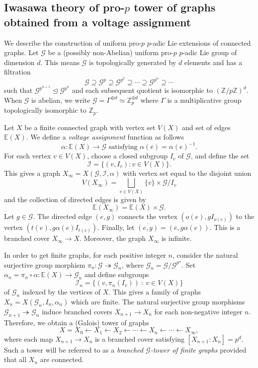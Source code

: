 \documentclass{amsart}
\numberwithin{equation}{section}
\theoremstyle{remark}
\newcommand{\Z}{\mathbb{Z}}
\newcommand{\E}{\mathbb{E}}
\newcommand{\I}{\mathcal{I}}
\newcommand{\cG}{\mathcal{G}}
\theoremstyle{plain} %
\begin{document}
\subsection{Iwasawa theory of pro-\texorpdfstring{$p$}{} tower of graphs obtained from a voltage assignment}
\label{sec: IT of pro-p tower}
We describe the construction of uniform pro-$p$ $p$-adic Lie extensions of connected graphs.
Let $\cG$ be a (possibly non-Abelian) uniform pro-$p$ $p$-adic Lie group of dimension $d$.
This means $\cG$ is topologically generated by $d$ elements and has a filtration 
\[
\cG \supseteq \cG^p \supseteq \cG^{p^2} \supseteq \cdots \supseteq \cG^{p^n} \supseteq \cdots 
\]
such that $\cG^{p^{n+1}} \trianglelefteq \cG^{p^n}$ and each subsequent quotient is isomorphic to $(\Z/p\Z)^d$.
{When $\cG$ is abelian, we write $\cG = \Gamma^{\oplus d} \simeq \Z^{\oplus d}_p$ where $\Gamma$ is a multiplicative group topologically isomorphic to $\Z_p$.}

Let $X$ be a finite connected graph with vertex set $V(X)$ and set of edges $\E(X)$.
We define a \textit{voltage assignment} function as follows 
\[
\alpha \colon \E(X) \longrightarrow \cG \textrm{ satisfying  } \alpha(\overline{e}) = \alpha(e)^{-1}.
\]
For each vertex $v\in V(X)$, choose a closed subgroup $I_v$ of $\cG$, and define the set 
\[
\I = \{(v,I_v) : v \in V(X)\}.
\]
This gives a graph $X_\infty = X(\cG,\I,\alpha)$ with vertex set equal to the disjoint union
\[
V(X_\infty) = \bigsqcup_{v\in V(X)} \{v\} \times \cG/I_v
\] and the collection of directed edges is given by 
\[
\E(X_\infty)=\E(X)\times \cG.
\]
Let $g\in \cG$.
The directed edge $(e,g)$ connects the vertex $(o(e),gI_{o(e)})$ to the vertex $(t(e), g \alpha(e)I_{t(e)})$.
Finally, let $\overline{(e, g)} = (\overline{e},g \alpha(e))$.
This is a branched cover $X_\infty \to X$.
Moreover, the graph $X_\infty$ is infinite.

In order to get finite graphs, for each positive integer $n$, consider the natural surjective group morphism $\pi_n \colon \cG \twoheadrightarrow \cG_n$, where $\cG_n = \cG/\cG^{p^n}$.
Set $\alpha_n = \pi_n \circ \alpha \colon \E(X) \to \cG_n$ and define subgroups 
\[
\I_n = \{(v,\pi_n(I_v)) \ : \ v \in V(X)\}
\]
of $\cG_n$ indexed by the vertices of $X$.
This gives a family of graphs $X_n =X(\cG_n,I_n,\alpha_n)$ which are finite.
The natural surjective group morphisms $\cG_{n+1} \twoheadrightarrow \cG_n$ induce branched covers $X_{n+1} \to X_n$ for each non-negative integer $n$.
Therefore, we obtain a (Galois) tower of graphs 
\[
X = X_0 \longleftarrow X_1 \longleftarrow X_2 \longleftarrow \cdots \longleftarrow X_n \longleftarrow \cdots \longleftarrow X_\infty, 
\]
where each map $X_{n+1} \to X_n$ is a branched cover satisfying $[X_{n+1} : X_n] = p^d$.
Such a tower will be referred to as a \emph{branched $\cG$-tower of finite graphs} provided that all $X_n$ are connected.
\end{document}
